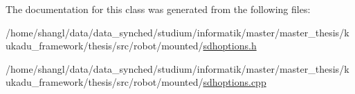 \-The documentation for this class was generated from the following files\-:\begin{DoxyCompactItemize}
\item 
/home/shangl/data/data\-\_\-synched/studium/informatik/master/master\-\_\-thesis/kukadu\-\_\-framework/thesis/src/robot/mounted/\hyperlink{sdhoptions_8h}{sdhoptions.\-h}\item 
/home/shangl/data/data\-\_\-synched/studium/informatik/master/master\-\_\-thesis/kukadu\-\_\-framework/thesis/src/robot/mounted/\hyperlink{sdhoptions_8cpp}{sdhoptions.\-cpp}\end{DoxyCompactItemize}
